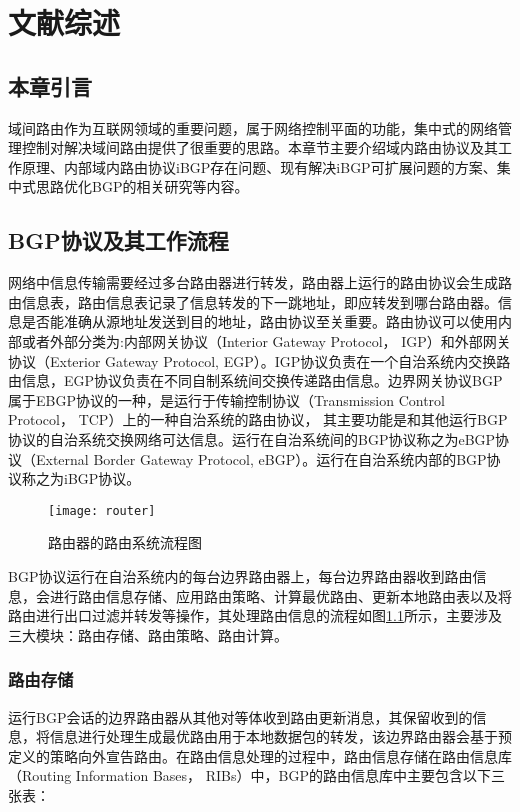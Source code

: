 \chapter{文献综述}
\label{cha:review}

\section{本章引言}
域间路由作为互联网领域的重要问题，属于网络控制平面的功能，集中式的网络管理控制对解决域间路由提供了很重要的思路。本章节主要介绍域内路由协议及其工作原理、内部域内路由协议iBGP存在问题、现有解决iBGP可扩展问题的方案、集中式思路优化BGP的相关研究等内容。

\section{BGP协议及其工作流程}

网络中信息传输需要经过多台路由器进行转发，路由器上运行的路由协议会生成路由信息表，路由信息表记录了信息转发的下一跳地址，即应转发到哪台路由器。信息是否能准确从源地址发送到目的地址，路由协议至关重要。路由协议\cite{DianeTeare2016CCNP}可以使用内部或者外部分类为:内部网关协议（Interior Gateway Protocol， IGP）和外部网关协议（Exterior Gateway Protocol, EGP）。IGP协议负责在一个自治系统内交换路由信息，EGP协议负责在不同自制系统间交换传递路由信息。边界网关协议BGP\cite{rfc1771}属于EBGP协议的一种，是运行于传输控制协议（Transmission Control Protocol， TCP）上的一种自治系统的路由协议， 其主要功能是和其他运行BGP协议的自治系统交换网络可达信息。运行在自治系统间的BGP协议称之为eBGP协议（External Border Gateway Protocol, eBGP）。运行在自治系统内部的BGP协议称之为iBGP协议。

\begin{figure}
  \centering
  \texttt{[image: router]}
  \caption{路由器的路由系统流程图\cite{journals/saem/KumarK14}}
  \label{fig:router}
\end{figure}

BGP协议运行在自治系统内的每台边界路由器上，每台边界路由器收到路由信息，会进行路由信息存储、应用路由策略、计算最优路由、更新本地路由表以及将路由进行出口过滤并转发等操作，其处理路由信息的流程如图\ref{fig:router}所示，主要涉及三大模块：路由存储、路由策略、路由计算。

\subsection{路由存储}
运行BGP会话的边界路由器从其他对等体收到路由更新消息，其保留收到的信息，将信息进行处理生成最优路由用于本地数据包的转发，该边界路由器会基于预定义的策略向外宣告路由。在路由信息处理的过程中，路由信息存储在路由信息库（Routing Information Bases， RIBs）中，BGP的路由信息库\cite{rfc1771}中主要包含以下三张表：

